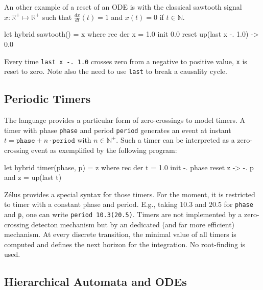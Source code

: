 \documentclass[11pt,titlepage,twoside]{report}
\newcommand{\zelus}{{\sf Z\'elus}}
\newcommand{\DotNotation}[1]{\frac{\mathit{d}{#1}}{\mathit{dt}}}
\newcommand{\bR}{\mathbb{R}}
\newcommand{\bN}{\mathbb{N}}
\newcommand{\Marc}[1]{{\bf Marc.} {#1} {\bf Fin}}
\begin{document}

An other example of a reset of an ODE is with the classical sawtooth
signal $x: \bR^+ \mapsto \bR^+$ such that $\DotNotation{x}(t) = 1$ and
$x(t) = 0$ if $t\in\bN$.
\begin{chklisting}[withresult]
let hybrid sawtooth() = x where
  rec der x = 1.0 init 0.0 reset up(last x -. 1.0) -> 0.0
\end{chklisting}
%
Every time \texttt{last x -. 1.0} crosses zero from a negative to positive value,
\texttt{x} is reset to zero. Note also the need to use \texttt{last} to break
a causality cycle.

\subsection{Periodic Timers\label{periodictimers}} %

The language provides a particular form of zero-crossings to model
timers. A timer with phase \texttt{phase} and period \texttt{period} generates
an event at instant $t = \mathtt{phase} + n \cdot \mathtt{period}$ with
$n \in \bN^+$. Such a timer can be interpreted as a zero-crossing event as
exemplified by the following program:
\begin{chklisting}[withresult]
let hybrid timer(phase, p) = z where
  rec der t = 1.0 init -. phase reset z -> -. p
  and z = up(last t)
\end{chklisting}

\zelus{} provides a special syntax for those timers. For the moment,
it is restricted to timer with a constant phase and period. E.g.,
taking $10.3$ and $20.5$ for \texttt{phase} and \texttt{p}, one can
write \texttt{period 10.3(20.5)}. Timers are not implemented by a 
zero-crossing detecton mechanism
but by an dedicated (and far more efficient) mechanism. At every discrete transition,
the minimal value of all timers is computed and defines the next horizon for the
integration. No root-finding is used.

\subsection{Hierarchical Automata and ODEs\label{hautoodes}} %
\end{document}
